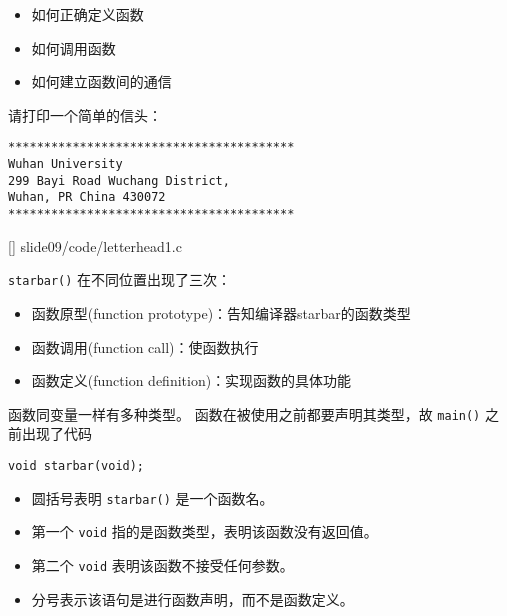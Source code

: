 \begin{frame}[fragile]
\begin{itemize}
\item 如何正确定义函数\\[0.1in]
\item 如何调用函数\\[0.1in]
\item 如何建立函数间的通信
\end{itemize}

\end{frame}

\begin{frame}[fragile]
请打印一个简单的信头：
\begin{lstlisting}[backgroundcolor=\color{red!10}]
****************************************
Wuhan University
299 Bayi Road Wuchang District,
Wuhan, PR China 430072
****************************************
\end{lstlisting}
\end{frame}

\begin{frame}

[]
{slide09/code/letterhead1.c}
\end{frame}


\begin{frame}[fragile]
  \lstinline|starbar()| 在不同位置出现了三次：\vspace{0.1in}

\begin{itemize}
\item 函数原型{\tf (function prototype)}：告知编译器starbar的函数类型\\[0.1in]
\item 函数调用{\tf (function call)}：使函数执行\\[0.1in]
\item 函数定义{\tf (function definition)}：实现函数的具体功能
\end{itemize}
\end{frame}

\begin{frame}[fragile]

函数同变量一样有多种类型。 
函数在被使用之前都要声明其类型，故 \lstinline|main()| 之前出现了代码
\begin{lstlisting}[backgroundcolor=\color{red!10}]
void starbar(void);
\end{lstlisting}
\begin{itemize}
\item
圆括号表明 \lstinline|starbar()| 是一个函数名。\\[0.1in]
\item 
第一个 \lstinline|void| 指的是函数类型，表明该函数没有返回值。\\[0.1in]
\item 
第二个 \lstinline|void| 表明该函数不接受任何参数。\\[0.1in]
\item 
分号表示该语句是进行函数声明，而不是函数定义。 
\end{itemize}
\end{frame}

